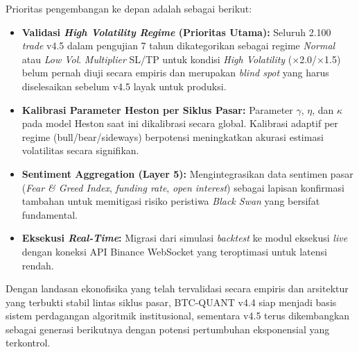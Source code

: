 Prioritas pengembangan ke depan adalah sebagai berikut:
\begin{itemize}
    \item \textbf{Validasi \textit{High Volatility Regime} (Prioritas Utama):} Seluruh 2.100 \textit{trade} v4.5 dalam pengujian 7 tahun dikategorikan sebagai regime \textit{Normal} atau \textit{Low Vol}. \textit{Multiplier} SL/TP untuk kondisi \textit{High Volatility} ($\times$2.0/$\times$1.5) belum pernah diuji secara empiris dan merupakan \textit{blind spot} yang harus diselesaikan sebelum v4.5 layak untuk produksi.
    \item \textbf{Kalibrasi Parameter Heston per Siklus Pasar:} Parameter $\gamma$, $\eta$, dan $\kappa$ pada model Heston saat ini dikalibrasi secara global. Kalibrasi adaptif per regime (bull/bear/sideways) berpotensi meningkatkan akurasi estimasi volatilitas secara signifikan.
    \item \textbf{Sentiment Aggregation (Layer 5):} Mengintegrasikan data sentimen pasar (\textit{Fear \& Greed Index}, \textit{funding rate}, \textit{open interest}) sebagai lapisan konfirmasi tambahan untuk memitigasi risiko peristiwa \textit{Black Swan} yang bersifat fundamental.
    \item \textbf{Eksekusi \textit{Real-Time}:} Migrasi dari simulasi \textit{backtest} ke modul eksekusi \textit{live} dengan koneksi API Binance WebSocket yang teroptimasi untuk latensi rendah.
\end{itemize}

Dengan landasan ekonofisika yang telah tervalidasi secara empiris dan arsitektur yang terbukti stabil lintas siklus pasar, BTC-QUANT v4.4 siap menjadi basis sistem perdagangan algoritmik institusional, sementara v4.5 terus dikembangkan sebagai generasi berikutnya dengan potensi pertumbuhan eksponensial yang terkontrol.
